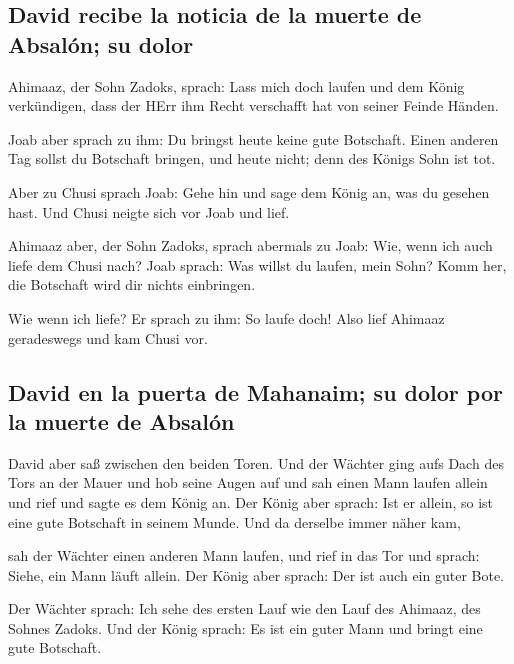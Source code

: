 \hypertarget{david-recibe-la-noticia-de-la-muerte-de-absaluxf3n-su-dolor}{%
\subsection{David recibe la noticia de la muerte de Absalón; su
dolor}\label{david-recibe-la-noticia-de-la-muerte-de-absaluxf3n-su-dolor}}

 Ahimaaz, der Sohn Zadoks, sprach: Lass mich doch laufen
und dem König verkündigen, dass der HErr ihm Recht verschafft hat von
seiner Feinde Händen.

 Joab aber sprach zu ihm: Du bringst heute keine gute
Botschaft. Einen anderen Tag sollst du Botschaft bringen, und heute
nicht; denn des Königs Sohn ist tot.

 Aber zu Chusi sprach Joab: Gehe hin und sage dem König
an, was du gesehen hast. Und Chusi neigte sich vor Joab und lief.

 Ahimaaz aber, der Sohn Zadoks, sprach abermals zu Joab:
Wie, wenn ich auch liefe dem Chusi nach? Joab sprach: Was willst du
laufen, mein Sohn? Komm her, die Botschaft wird dir nichts einbringen.

 Wie wenn ich liefe? Er sprach zu ihm: So laufe doch!
Also lief Ahimaaz geradeswegs und kam Chusi vor.

\hypertarget{david-en-la-puerta-de-mahanaim-su-dolor-por-la-muerte-de-absaluxf3n}{%
\subsection{David en la puerta de Mahanaim; su dolor por la muerte de
Absalón}\label{david-en-la-puerta-de-mahanaim-su-dolor-por-la-muerte-de-absaluxf3n}}

 David aber saß zwischen den beiden Toren. Und der
Wächter ging aufs Dach des Tors an der Mauer und hob seine Augen auf und
sah einen Mann laufen allein  und rief und sagte es dem
König an. Der König aber sprach: Ist er allein, so ist eine gute
Botschaft in seinem Munde. Und da derselbe immer näher kam,

 sah der Wächter einen anderen Mann laufen, und rief in
das Tor und sprach: Siehe, ein Mann läuft allein. Der König aber sprach:
Der ist auch ein guter Bote.

 Der Wächter sprach: Ich sehe des ersten Lauf wie den
Lauf des Ahimaaz, des Sohnes Zadoks. Und der König sprach: Es ist ein
guter Mann und bringt eine gute Botschaft.

